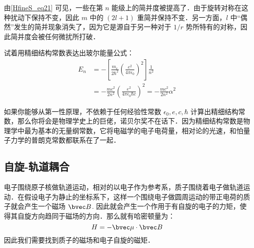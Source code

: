 由\autoref{HfineS_eq21} 可见，一些在第 $n$ 能级上的简并度被提高了．由于旋转对称在这种扰动下保持不变，因此 $m$ 中的 $(2l+1)$ 重简并保持不变．另一方面，$l$ 中“偶然”发生的简并现象消失了，因为它是源自于另一种对于 $1/r$ 势所特有的对称，因此简并度会被任何微扰所打破．
\begin{example}{}
试着用精细结构常数表达出玻尔能量公式：
\begin{align}
E_n&=-\left[\frac {m_e}{2\hbar^{2}} \left(\frac {e^ {2}}{4\pi \epsilon_0}\right)^ {2}\right]  \frac {1}{n^2}\\
&=-\frac{mc^2}{2n^2}\left(\frac {e^{2}}{4\pi \epsilon_0\hbar c}\right)^2=-\frac{mc^2}{2n^2}\alpha^2
\end{align}
\end{example}

如果你能够从第一性原理，不依赖于任何经验性常数 $\epsilon_0,e,c,\hbar$ 计算出精细结构常数，那么你将会是物理学史上的巨佬，诺贝尔奖不在话下．因为精细结构常数是物理学中最为基本的无量纲常数，它将电磁学的电子电荷量，相对论的光速，和怕量子力学的普朗克常数都联系在了一起．
\subsection{自旋-轨道耦合}
电子围绕原子核做轨道运动，相对的以电子作为参考系，质子围绕着电子做轨道运动．在假设电子为静止的坐标系下，这样一个围绕电子做圆周运动的带正电荷的质子就会产生一个磁场 $\bvec B$. 因此就会产生一个作用于有自旋的电子的力矩，使得其自旋方向趋同于磁场的方向．那么就有哈密顿量为：
\begin{equation}\label{HfineS_eq26}
H=-\bvec\mu \cdot \bvec B
\end{equation}
因此我们需要找到质子的磁场和电子自旋的磁矩．

